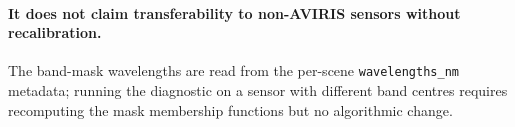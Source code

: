 \documentclass[11pt,a4paper]{article}
\begin{document}
\paragraph{It does not claim transferability to non-AVIRIS sensors
without recalibration.} The band-mask wavelengths are read from the
per-scene \texttt{wavelengths\_nm} metadata; running the diagnostic
on a sensor with different band centres requires recomputing the
mask membership functions but no algorithmic change.



\end{document}
